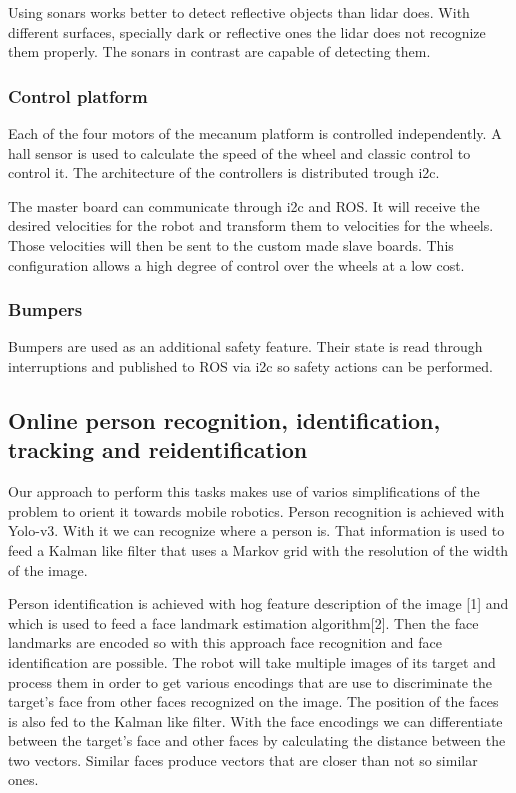 Using sonars works better to detect reflective objects than lidar does.
With different surfaces, specially dark or reflective ones the lidar does not recognize them properly.
The sonars in contrast are capable of detecting them.

\subsubsection{Control platform}
Each of the four motors of the mecanum platform is controlled independently.
A hall sensor is used to calculate the speed of the wheel and classic control to control it.
The architecture of the controllers is distributed trough i2c.

The master board can communicate through i2c and ROS.
It will receive the desired velocities for the robot and transform them to velocities for the wheels.
Those velocities will then be sent to the custom made slave boards.
This configuration allows a high degree of control over the wheels at a low cost.

\subsubsection{Bumpers}
Bumpers are used as an additional safety feature.
Their state is read through interruptions and published to ROS via i2c so safety actions can be performed.

\subsection{Online person recognition, identification, tracking and reidentification}
Our approach to perform this tasks makes use of varios simplifications of the problem to orient it towards mobile robotics.
Person recognition is achieved with Yolo-v3.
With it we can recognize where a person is.
That information is used to feed a Kalman like filter that uses a Markov grid with the resolution of the width of the image.

Person identification is achieved with hog feature description of the image [1] and which is used to feed a face landmark estimation algorithm[2].
Then the face landmarks are encoded so with this approach face recognition and face identification are possible.
The robot will take multiple images of its target and process them in order to get various encodings that are use to discriminate the target's face from other faces recognized on the image.
The position of the faces is also fed to the Kalman like filter.
With the face encodings we can differentiate between the target's face and other faces by calculating the distance between the two vectors.
Similar faces produce vectors that are closer than not so similar ones.

